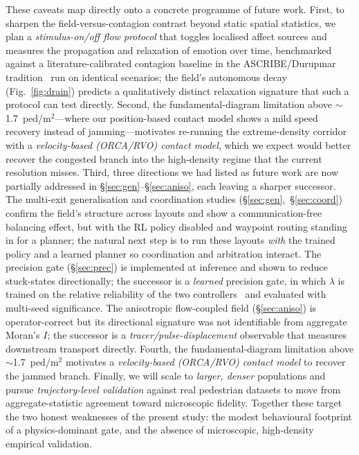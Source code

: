 \documentclass[sigconf,nonacm]{acmart}
\begin{document}
These caveats map directly onto a concrete programme of future work. First, to sharpen the field-versus-contagion contrast beyond static spatial statistics, we plan a \emph{stimulus-on/off flow protocol} that toggles localised affect sources and measures the propagation and relaxation of emotion over time, benchmarked against a literature-calibrated contagion baseline in the ASCRIBE/Durup\i nar tradition~\cite{bosse2013ascribe,durupinar2016} run on identical scenarios; the field's autonomous decay (Fig.~\ref{fig:drain}) predicts a qualitatively distinct relaxation signature that such a protocol can test directly. Second, the fundamental-diagram limitation above $\sim$1.7~ped/m$^2$---where our position-based contact model shows a mild speed recovery instead of jamming---motivates re-running the extreme-density corridor with a \emph{velocity-based (ORCA/RVO) contact model}, which we expect would better recover the congested branch into the high-density regime that the current resolution misses. Third, three directions we had listed as future work are now partially addressed in
\S\ref{sec:gen}--\S\ref{sec:aniso}, each leaving a sharper successor. The multi-exit generalisation
and coordination studies (\S\ref{sec:gen},~\S\ref{sec:coord}) confirm the field's structure across
layouts and show a communication-free balancing effect, but with the RL policy disabled and waypoint
routing standing in for a planner; the natural next step is to run these layouts \emph{with} the
trained policy and a learned planner so coordination and arbitration interact. The precision gate
(\S\ref{sec:prec}) is implemented at inference and shown to reduce stuck-states directionally; the
successor is a \emph{learned} precision gate, in which $\lambda$ is trained on the relative reliability
of the two controllers~\cite{daw2005,lee2014} and evaluated with multi-seed significance. The
anisotropic flow-coupled field (\S\ref{sec:aniso}) is operator-correct but its directional signature
was not identifiable from aggregate Moran's $I$; the successor is a \emph{tracer/pulse-displacement}
observable that measures downstream transport directly. Fourth, the fundamental-diagram limitation
above $\sim$1.7~ped/m$^2$ motivates a \emph{velocity-based (ORCA/RVO) contact model} to recover the
jammed branch. Finally, we will scale to \emph{larger, denser} populations and pursue
\emph{trajectory-level validation} against real pedestrian datasets to move from aggregate-statistic
agreement toward microscopic fidelity. Together these target the two honest weaknesses of the present
study: the modest behavioural footprint of a physics-dominant gate, and the absence of microscopic,
high-density empirical validation.
\end{document}
